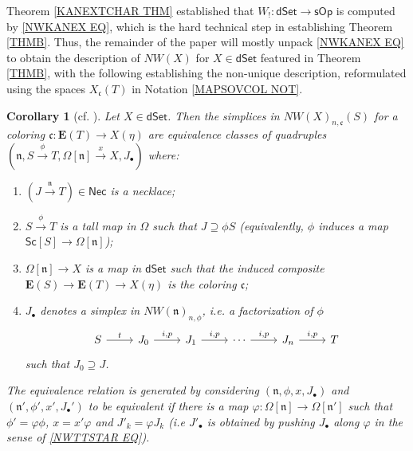 \documentclass[a4paper,10pt]{article}%
\numberwithin{equation}{section}
\numberwithin{figure}{section}
\newtheorem{corollary}[equation]{Corollary}%
\theoremstyle{definition} %
\newcommand{\sOp}{\mathsf{sOp}}
\newcommand{\dSet}{\mathsf{dSet}}
\begin{document}
Theorem \ref{KANEXTCHAR THM} established that 
$W_!\colon \dSet \to \sOp$ is computed by \eqref{NWKANEX EQ},
which is the hard technical step in establishing Theorem \ref{THMB}.
Thus, the remainder of the paper will mostly unpack \eqref{NWKANEX EQ}
to obtain the description of $NW(X)$ for $X \in \dSet$
featured in Theorem \ref{THMB},
with the following establishing the non-unique
description,
reformulated using the spaces $X_{\mathfrak{c}}(T)$ in
Notation \ref{MAPSOVCOL NOT}.


\begin{corollary}[{cf. \cite[Cor. 4.4]{DS11}}]
	\label{NWXREPS COR}
	Let $X\in \mathsf{dSet}$.
	Then the simplices in
	$NW(X)_{n,\mathfrak{c}}(S)$
	for a coloring 
	$\mathfrak{c}\colon \boldsymbol{E}(T) \to X(\eta)$
	are equivalence classes of quadruples
	$(\mathfrak{n}, S \xrightarrow{\phi} T, \Omega[\mathfrak{n}] \xrightarrow{x} X, J_{\bullet})$ 
	where:
	\begin{enumerate}[label=(\roman*)]
		\item $(J \xrightarrow{\mathfrak{n}} T) \in \mathsf{Nec}$ is a necklace; 
		\item $S \xrightarrow{\phi} T$
		is a tall map in $\Omega$
		such that $J \supseteq \phi S$
		(equivalently, $\phi$ induces a map
		$\mathsf{Sc}[S] \to \Omega[\mathfrak{n}]$);		
		\item $\Omega[ \mathfrak{n}] \to X$ is a map in $\mathsf{dSet}$
		such that the induced composite
		$\boldsymbol{E}(S) \to 
		\boldsymbol{E}(T) \to X(\eta)$
		is the coloring $\mathfrak{c}$;
		\item $J_{\bullet}$ denotes a simplex in $NW(\mathfrak{n})_{n,\phi}$, i.e.
		a factorization of $\phi$	
	\begin{equation}\label{STRINCOR EQ}
	\begin{tikzcd}
		S \ar{r}{t}
	&
		J_0 \ar{r}{i,p}
	&
		J_1 \ar{r}{i,p}
	&
		\cdots
		\ar{r}{i,p}
	&
		J_n \ar{r}{i,p}
	&
		T
	\end{tikzcd}
	\end{equation}
		such that 
		$J_0 \supseteq J$.
	\end{enumerate}
%
The equivalence relation is generated by considering 
$(\mathfrak{n},\phi,x,J_{\bullet})$ and
$(\mathfrak{n}',\phi',x',J_{\bullet}')$
to be equivalent if there is
a map
$\varphi \colon \Omega[\mathfrak{n}] \to \Omega[\mathfrak{n}']$
such that
$\phi' = \varphi \phi$,
$x = x' \varphi $
and
$J'_k = \varphi J_k$
(i.e $J'_{\bullet}$
is obtained by pushing 
$J_{\bullet}$ along $\varphi$
in the sense of \eqref{NWTTSTAR EQ}).
\end{corollary}
\end{document}
